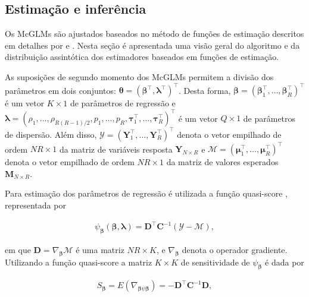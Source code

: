\subsection{Estimação e inferência}

Os McGLMs são ajustados baseados no método de funções de estimação descritos em detalhes por \citet{Bonat16} e \citet{jorg04}. Nesta seção é apresentada uma visão geral do algoritmo e da distribuição assintótica dos estimadores baseados em funções de estimação.

As suposições de segundo momento dos McGLMs permitem a divisão dos
parâmetros em dois conjuntos: $\boldsymbol{\theta} = (\boldsymbol{\beta}^{\top}, \boldsymbol{\lambda}^{\top})^{\top}$. Desta forma, $\boldsymbol{\beta} = (\boldsymbol{\beta}_1^\top, \ldots, \boldsymbol{\beta}_R^\top)^\top$ é um vetor $K \times 1$ de parâmetros de regressão e $\boldsymbol{\lambda} = (\rho_1, \ldots, \rho_{R(R-1)/2}, p_1, \ldots, p_R, \boldsymbol{\tau}_1^\top, \ldots, \boldsymbol{\tau}_R^\top)^\top$ é um vetor $Q \times 1$ de parâmetros de dispersão. Além disso, $\mathcal{Y} = (\boldsymbol{Y}_1^\top, \ldots, \boldsymbol{Y}_R^\top)^\top$ denota o vetor empilhado de ordem $NR \times 1$ da matriz de variáveis resposta $\boldsymbol{Y}_{N \times R}$ e $\mathcal{M} = (\boldsymbol{\mu}_1^\top, \ldots, \boldsymbol{\mu}_R^\top)^\top$ denota o vetor empilhado de ordem $NR \times 1$ da matriz de valores esperados $\boldsymbol{M}_{N \times R}$.

Para estimação dos parâmetros de regressão é utilizada a função quasi-score \citep{Liang86}, representada por

\begin{equation}
\label{eq:qs}
      \begin{aligned}
        \psi_{\boldsymbol{\beta}}(\boldsymbol{\beta},
          \boldsymbol{\lambda}) = \boldsymbol{D}^\top
            \boldsymbol{C}^{-1}(\mathcal{Y} - \mathcal{M}),
\end{aligned}
\end{equation}

\noindent em que $\boldsymbol{D} = \nabla_{\boldsymbol{\beta}} \mathcal{M}$ 
é uma matriz $NR \times K$, e $\nabla_{\boldsymbol{\beta}}$ denota o 
operador gradiente. Utilizando a função quasi-score a matriz $K \times K$
de sensitividade de $\psi_{\boldsymbol{\beta}}$ é dada por

$$
\begin{aligned}
S_{\boldsymbol{\beta}} = E(\nabla_{\boldsymbol{\beta} \psi \boldsymbol{\beta}}) = -\boldsymbol{D}^{\top} \boldsymbol{C}^{-1} \boldsymbol{D},
\end{aligned}
$$

